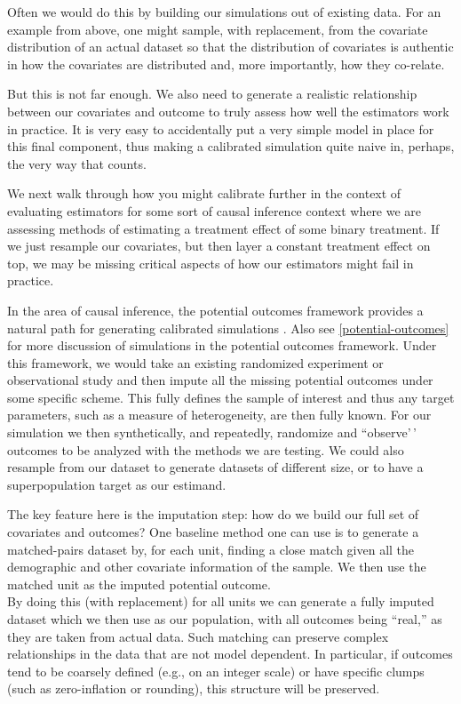 \documentclass[
]{book}
\begin{document}
Often we would do this by building our simulations out of existing data.
For an example from above, one might sample, with replacement, from the covariate distribution of an actual dataset so that the distribution of covariates is authentic in how the covariates are distributed and, more importantly, how they co-relate.

But this is not far enough.
We also need to generate a realistic relationship between our covariates and outcome to truly assess how well the estimators work in practice.
It is very easy to accidentally put a very simple model in place for this final component, thus making a calibrated simulation quite naive in, perhaps, the very way that counts.

We next walk through how you might calibrate further in the context of evaluating estimators for some sort of causal inference context where we are assessing methods of estimating a treatment effect of some binary treatment.
If we just resample our covariates, but then layer a constant treatment effect on top, we may be missing critical aspects of how our estimators might fail in practice.

In the area of causal inference, the potential outcomes framework provides a natural path for generating calibrated simulations \citep{Kern_calibrated}.
Also see \ref{potential-outcomes} for more discussion of simulations in the potential outcomes framework.
Under this framework, we would take an existing randomized experiment or observational study and then impute all the missing potential outcomes under some specific scheme.
This fully defines the sample of interest and thus any target parameters, such as a measure of heterogeneity, are then fully known.
For our simulation we then synthetically, and repeatedly, randomize and ``observe'\,' outcomes to be analyzed with the methods we are testing.
We could also resample from our dataset to generate datasets of different size, or to have a superpopulation target as our estimand.

The key feature here is the imputation step: how do we build our full set of covariates and outcomes?
One baseline method one can use is to generate a matched-pairs dataset by, for each unit, finding a close match given all the demographic and other covariate information of the sample. We then use the matched unit as the imputed potential outcome.\\
By doing this (with replacement) for all units we can generate a fully imputed dataset which we then use as our population, with all outcomes being ``real,'' as they are taken from actual data.
Such matching can preserve complex relationships in the data that are not model dependent.
In particular, if outcomes tend to be coarsely defined (e.g., on an integer scale) or have specific clumps (such as zero-inflation or rounding), this structure will be preserved.
\end{document}
